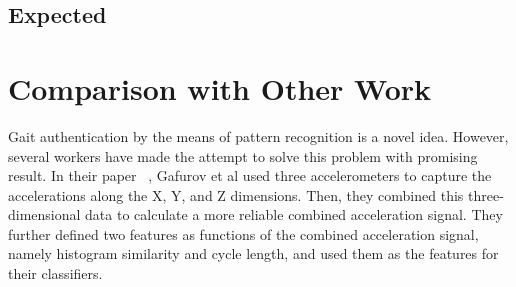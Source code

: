 \documentclass[10pt,twocolumn,letterpaper]{article}
\begin{document}
\subsection{Expected}

\section{Comparison with Other Work}
Gait authentication by the means of pattern recognition is a novel idea. However, several workers have made the attempt to solve this problem with promising result. In their paper ~\cite{Author03}, Gafurov et al used three accelerometers to capture the accelerations along the X, Y, and Z dimensions. Then, they combined this three-dimensional data to calculate a more reliable combined acceleration signal. They further defined two features as functions of the combined acceleration signal, namely histogram similarity and cycle length, and used them as the features for their classifiers.

{\small


}
\end{document}
